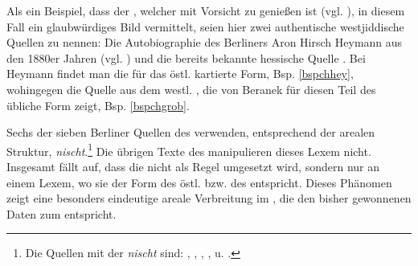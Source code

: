 Als ein Beispiel, dass der , welcher mit Vorsicht zu genießen ist (vgl. \cite{GuggenheimGruenberg1966b}), in diesem Fall ein glaubwürdiges Bild vermittelt, seien hier zwei authentische westjiddische Quellen zu nennen: Die Autobiographie des Berliners Aron Hirsch Heymann aus den 1880er Jahren (vgl. \cite{Schaefer2013}) und die bereits bekannte hessische Quelle . Bei Heymann findet man die für das östl.  kartierte Form, Bsp. \ref{bspchhey}, wohingegen die Quelle aus dem westl. , die von Beranek für diesen Teil des  übliche Form zeigt, Bsp. \ref{bspchgrob}.\\


Sechs der sieben Berliner Quellen des  verwenden, entsprechend der arealen Struktur, \textit{nischt}.\footnote{Die Quellen mit der  \textit{nischt} sind: , , , ,  u. .} Die übrigen Texte des  manipulieren dieses Lexem nicht.\\

 
Insgesamt fällt auf, dass die  nicht als Regel umgesetzt wird, sondern nur an einem Lexem, wo sie der Form des östl.  bzw. des  entspricht. Dieses Phänomen zeigt eine besonders eindeutige areale Verbreitung im , die den bisher gewonnenen Daten zum  entspricht.\\




